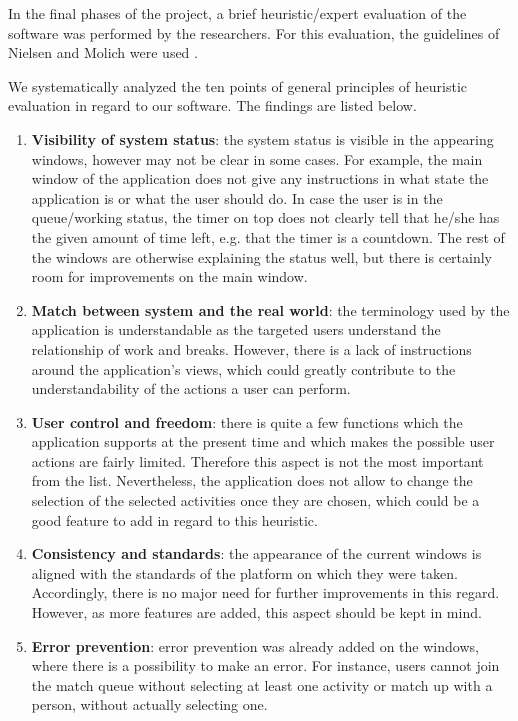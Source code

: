 In the final phases of the project, a brief heuristic/expert evaluation of the software was performed by the researchers. For this evaluation, the guidelines of Nielsen and Molich were used \cite{nielsen} \cite{nielsenonline}. 

We systematically analyzed the ten points of general principles of heuristic evaluation in regard to our software. The findings are listed below. 

\begin{enumerate}
	\item \textbf{Visibility of system status}: the system status is visible in the appearing windows, however may not be clear in some cases. For example, the main window of the application does not give any instructions in what state the application is or what the user should do. In case the user is in the queue/working status, the timer on top does not clearly tell that he/she has the given amount of time left, e.g. that the timer is a countdown. The rest of the windows are otherwise explaining the status well, but there is certainly room for improvements on the main window. 
	\item \textbf{Match between system and the real world}: the terminology used by the application is understandable as the targeted users understand the relationship of work and breaks. However, there is a lack of instructions around the application's views, which could greatly contribute to the understandability of the actions a user can perform.
	\item \textbf{User control and freedom}: there is quite a few functions which the application supports at the present time and which makes the possible user actions are fairly limited. Therefore this aspect is not the most important from the list. Nevertheless, the application does not allow to change the selection of the selected activities once they are chosen, which could be a good feature to add in regard to this heuristic. 
	\item \textbf{Consistency and standards}: the appearance of the current windows is aligned with the standards of the platform on which they were taken. Accordingly, there is no major need for further improvements in this regard. However, as more features are added, this aspect should be kept in mind.
	\item \textbf{Error prevention}: error prevention was already added on the windows, where there is a possibility to make an error. For instance, users cannot join the match queue without selecting at least one activity or match up with a person, without actually selecting one. 

\end{enumerate}
